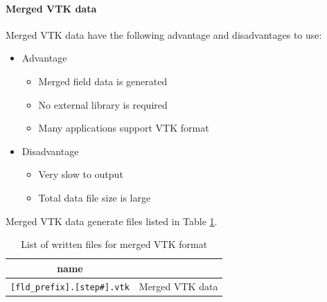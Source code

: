 \paragraph{Merged VTK data}
Merged VTK data have the following advantage and disadvantages to use:
%
\begin{itemize}
\item Advantage
\begin{itemize} 
\item Merged field data is generated
\item No external library is required
\item Many applications support VTK format
\end{itemize}
\item Disadvantage
\begin{itemize} 
\item Very slow to output
\item Total data file size is large
\end{itemize}
\end{itemize}
%
Merged VTK data generate files listed in Table \ref{table:Merged_vtk}. 
%
\begin{table}[htp]
\caption{List of written files for merged VTK format}
\begin{center} 
\begin{tabular}{|c|c|}
\hline
 name &  \\ \hline \hline
\verb|[fld_prefix].[step#].vtk|  & Merged VTK data  \\ \hline
\end{tabular}
\end{center}
\label{table:Merged_vtk}
\end{table}
%

